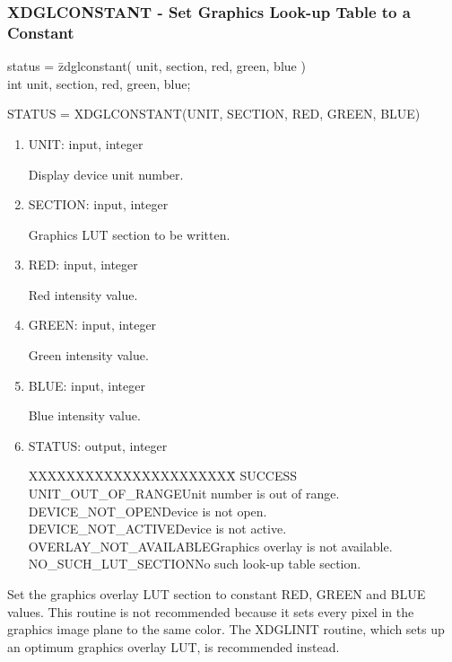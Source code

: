 \subsubsection{XDGLCONSTANT - Set Graphics Look-up Table to a Constant}
\begin{tabbing}
status = \=zdglconstant( unit, section, red, green, blue )\\
\>int  unit, section, red, green, blue;\\
\end{tabbing}
STATUS = XDGLCONSTANT(UNIT, SECTION, RED, GREEN, BLUE)
\begin{enumerate}
\item UNIT:  input, integer

Display device unit number.
\item SECTION:  input, integer

Graphics LUT section to be written.
\item RED:  input, integer

Red intensity value.
\item GREEN:  input, integer

Green intensity value.
\item BLUE:  input, integer

Blue intensity value.
\item STATUS:  output, integer
\begin{tabbing}
XXXXXXXXXXXXXXXXXXXXXX\=\kill
SUCCESS\\
UNIT\_OUT\_OF\_RANGE\>Unit number is out of range.\\
DEVICE\_NOT\_OPEN\>Device is not open.\\
DEVICE\_NOT\_ACTIVE\>Device is not active.\\
OVERLAY\_NOT\_AVAILABLE\>Graphics overlay is not available.\\
NO\_SUCH\_LUT\_SECTION\>No such look-up table section.\\
\end{tabbing}
\end{enumerate}
Set the graphics overlay LUT section to constant RED, GREEN and BLUE
values.  This routine is not recommended because it sets every pixel
in the graphics image plane to the same color.  The XDGLINIT routine,
which sets up an optimum graphics overlay LUT, is recommended instead.
\newpage
